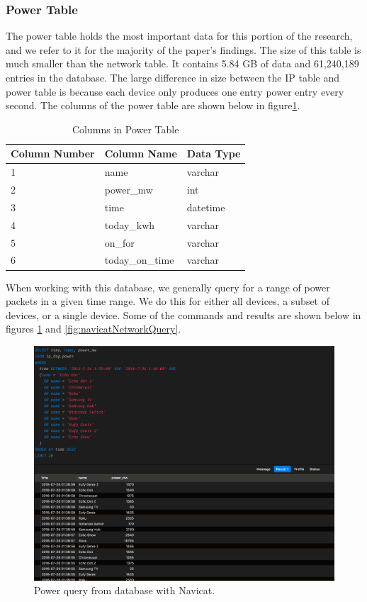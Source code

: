 \subsubsection{Power Table}

The power table holds the most important data for this portion of the research, and we refer to it for the majority of the paper's findings. The size of this table is much smaller than the network table. It contains 5.84 GB of data and 61,240,189 entries in the database. The large difference in size between the IP table and power table is because each device only produces one entry power entry every second. The columns of the power table are shown below in figure\ref{tab:powcol}.

\begin{table}[H]
    \centering
    \caption{Columns in Power Table}
    \begin{tabular}{@{}lll@{}}
    \toprule
    Column Number & Column Name     & Data Type \\ \midrule
    1             & name            & varchar   \\
    2             & power\_mw       & int       \\
    3             & time            & datetime  \\
    4             & today\_kwh      & varchar   \\
    5             & on\_for         & varchar   \\
    6             & today\_on\_time & varchar
    \end{tabular}
    \label{tab:powcol}
    \end{table}

When working with this database, we generally query for a range of power packets in a given time range. We do this for either all devices, a subset of devices, or a single device. Some of the commands and results are shown below in figures \ref{fig:navicatPowerQuery} and \ref{fig:navicatNetworkQuery}.

\begin{figure}[H]
    \centering
    \includegraphics[width=1\textwidth]{figures/navicatPowerQuery.png}
    \caption{Power query from database with Navicat.}
    \label{fig:navicatPowerQuery}
\end{figure}

